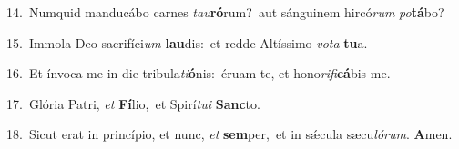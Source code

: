 {\numbfont\textcolor{\numbcolor}{14.}}~Numquid manducábo carnes \textit{tau}\-\textbf{ró}rum?~\star aut sánguinem hircó\textit{rum} \textit{po}\-\textbf{tá}bo?\par
{\numbfont\textcolor{\numbcolor}{15.}}~Immola Deo sacrifíci\textit{um} \textbf{lau}\-dis:~\star et redde Altíssimo \textit{vo}\-\textit{ta} \textbf{tu}\-a.\par
{\numbfont\textcolor{\numbcolor}{16.}}~Et ínvoca me in die tribula\-\textit{ti}\-\textbf{ó}nis:~\star éruam te, et hono\-\textit{ri}\-\textit{fi}\textbf{cá}bis me.\par
{\numbfont\textcolor{\numbcolor}{17.}}~Glória Patri, \textit{et} \textbf{Fí}\-lio,~\star et Spirí\-\textit{tu}\-\textit{i} \textbf{Sanc}\-to.\par
{\numbfont\textcolor{\numbcolor}{18.}}~Sicut erat in princípio, et nunc, \textit{et} \textbf{sem}\-per,~\star et in sǽcula sæcu\-\textit{ló}\-\textit{rum}. \textbf{A}\-men.\par
